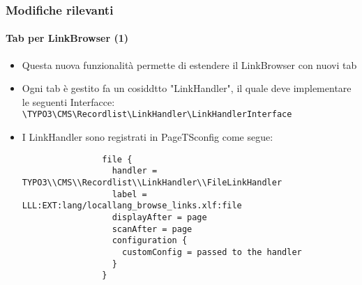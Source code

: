 
\begin{frame}[fragile]
	\frametitle{Modifiche rilevanti}
	\framesubtitle{Tab per LinkBrowser (1)}

	\lstset{basicstyle=\tiny\ttfamily}

	\begin{itemize}

		\item Questa nuova funzionalità permette di estendere il LinkBrowser con nuovi tab

		\item Ogni tab è gestito fa un cosiddtto "LinkHandler", il quale deve implementare le
			seguenti Interfacce:\newline
			\small
				\texttt{\textbackslash TYPO3\textbackslash CMS\textbackslash Recordlist\textbackslash LinkHandler\textbackslash LinkHandlerInterface}
			\normalsize

		\item I LinkHandler sono registrati in PageTSconfig come segue:

			\begin{lstlisting}
				file {
				  handler = TYPO3\\CMS\\Recordlist\\LinkHandler\\FileLinkHandler
				  label = LLL:EXT:lang/locallang_browse_links.xlf:file
				  displayAfter = page
				  scanAfter = page
				  configuration {
				    customConfig = passed to the handler
				  }
				}
			\end{lstlisting}

	\end{itemize}

\end{frame}


